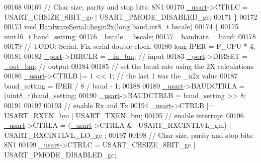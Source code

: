 \begin{DoxyCode}
00168     
00169     \textcolor{comment}{// Char size, parity and stop bits: 8N1}
00170     \hyperlink{class_hardware_serial_a3a3bd56aa561ae7e1eb1fd252b5b69a0}{_usart}->CTRLC = USART\_CHSIZE\_8BIT\_gc | USART\_PMODE\_DISABLED\_gc;
00171 \}
00172 
\hypertarget{_hardware_serial_8cpp_source_l00173}{}\hyperlink{class_hardware_serial_adcfab60db442174cb53f005df6d2996d}{00173} \textcolor{keywordtype}{void} \hyperlink{class_hardware_serial_adcfab60db442174cb53f005df6d2996d}{HardwareSerial::begin2x}(\textcolor{keywordtype}{long} baud,int8\_t bscale)
00174 \{
00175     uint16\_t baud\_setting;
00176     \hyperlink{class_hardware_serial_a37dd406c01fd6432618925f0aeb329f3}{_bscale} = bscale;
00177     \hyperlink{class_hardware_serial_ae692ab4a0a8aad73c74a10066fa9da24}{_baudrate} = baud;
00178     
00179     \textcolor{comment}{// TODO: Serial. Fix serial double clock.}
00180     \textcolor{keywordtype}{long} fPER = F\_CPU * 4;
00181     
00182     \hyperlink{class_hardware_serial_add54c7d986c6122e8e8c23303f5b4845}{_port}->DIRCLR = \hyperlink{class_hardware_serial_a8724fdfd3955eeff5d3ed535624ce79a}{_in_bm};  \textcolor{comment}{// input}
00183     \hyperlink{class_hardware_serial_add54c7d986c6122e8e8c23303f5b4845}{_port}->DIRSET = \hyperlink{class_hardware_serial_a751a284e15af72b026143a8091be1b70}{_out_bm}; \textcolor{comment}{// output}
00184     
00185     \textcolor{comment}{// set the baud rate using the 2X calculations}
00186     \hyperlink{class_hardware_serial_a3a3bd56aa561ae7e1eb1fd252b5b69a0}{_usart}->CTRLB |= 1 << 1; \textcolor{comment}{// the last 1 was the \_u2x value}
00187     baud\_setting = fPER / 8 / baud - 1;
00188 
00189     \hyperlink{class_hardware_serial_a3a3bd56aa561ae7e1eb1fd252b5b69a0}{_usart}->BAUDCTRLA = (uint8\_t)baud\_setting;
00190     \hyperlink{class_hardware_serial_a3a3bd56aa561ae7e1eb1fd252b5b69a0}{_usart}->BAUDCTRLB = baud\_setting >> 8;
00191     
00192     
00193     \textcolor{comment}{// enable Rx and Tx}
00194     \hyperlink{class_hardware_serial_a3a3bd56aa561ae7e1eb1fd252b5b69a0}{_usart}->CTRLB |= USART\_RXEN\_bm | USART\_TXEN\_bm;
00195     \textcolor{comment}{// enable interrupt}
00196     \hyperlink{class_hardware_serial_a3a3bd56aa561ae7e1eb1fd252b5b69a0}{_usart}->CTRLA = (\hyperlink{class_hardware_serial_a3a3bd56aa561ae7e1eb1fd252b5b69a0}{_usart}->CTRLA & ~USART\_RXCINTLVL\_gm) | USART\_RXCINTLVL\_LO\_gc
      ;
00197     
00198     \textcolor{comment}{// Char size, parity and stop bits: 8N1}
00199     \hyperlink{class_hardware_serial_a3a3bd56aa561ae7e1eb1fd252b5b69a0}{_usart}->CTRLC = USART\_CHSIZE\_8BIT\_gc | USART\_PMODE\_DISABLED\_gc;

\end{DoxyCode}
